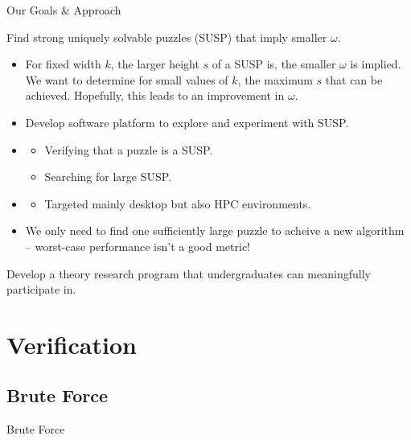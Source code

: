 \documentclass[t,10pt,
mathserif,xcolor=dvipsnames]{beamer}
\begin{document}
\begin{myframe}{Our Goals \& Approach}

   Find strong uniquely solvable puzzles (SUSP) that imply smaller $\omega$.

  \medskip
  
  \begin{itemize}
  \item For fixed width $k$, the larger height $s$ of a SUSP is, the
    smaller $\omega$ is implied. We want to determine for small values
    of $k$, the maximum $s$ that can be achieved.  Hopefully, this
    leads to an improvement in $\omega$.
  \item Develop software platform to explore and experiment with SUSP.
  \item {}
    \begin{itemize}
    \item Verifying that a puzzle is a SUSP.
    \item Searching for large SUSP.
    \end{itemize}
  \item {}
    \begin{itemize}
    \item Targeted mainly desktop but also HPC environments.
    \end{itemize}
  \item We only need to find one sufficiently large puzzle to acheive
    a new algorithm -- worst-case performance isn't a good metric!
  \end{itemize}

  \medskip
  
   Develop a theory research program that
  undergraduates can meaningfully participate in.
  
  
  
\end{myframe}

\section{Verification}


\subsection{Brute Force}

\begin{myframe}{Brute Force}

\end{myframe}
\end{document}
